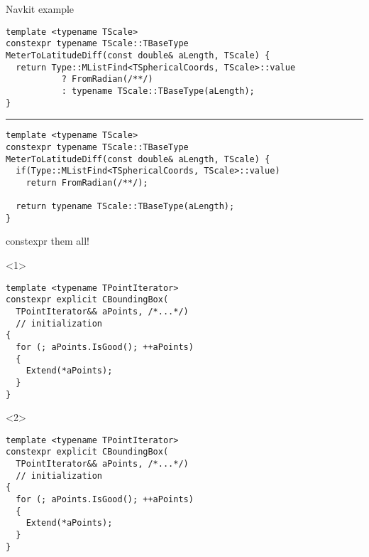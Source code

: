 \documentclass[10pt]{beamer}
\begin{document}
\begin{frame}[fragile]{Navkit example}
	\begin{verbatim}
template <typename TScale>
constexpr typename TScale::TBaseType
MeterToLatitudeDiff(const double& aLength, TScale) {
  return Type::MListFind<TSphericalCoords, TScale>::value
           ? FromRadian(/**/)
           : typename TScale::TBaseType(aLength);
}	
	\end{verbatim}

	\pause
	\hrule

	\begin{verbatim}
template <typename TScale>
constexpr typename TScale::TBaseType 
MeterToLatitudeDiff(const double& aLength, TScale) {
  if(Type::MListFind<TSphericalCoords, TScale>::value)
    return FromRadian(/**/);

  return typename TScale::TBaseType(aLength); 
}
	\end{verbatim}
\end{frame}

\begin{frame}[fragile]{constexpr them all!}
	\begin{onlyenv}
	\begin{verbatim}
template <typename TPointIterator>
constexpr explicit CBoundingBox(
  TPointIterator&& aPoints, /*...*/)
  // initialization
{
  for (; aPoints.IsGood(); ++aPoints)
  {
    Extend(*aPoints);
  }
}
	\end{verbatim}
	\end{onlyenv}

	\begin{onlyenv}
	\begin{verbatim}
template <typename TPointIterator>
constexpr explicit CBoundingBox(
  TPointIterator&& aPoints, /*...*/)
  // initialization
{
  for (; aPoints.IsGood(); ++aPoints)
  {
    Extend(*aPoints);
  }
}
	\end{verbatim}
	\end{onlyenv}
\end{frame}
\end{document}
